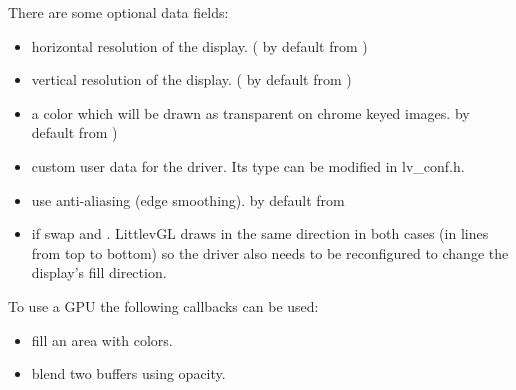\documentclass[letterpaper,10pt,english]{sphinxmanual}
\begin{document}
There are some optional data fields:
\begin{itemize}
\item {} 
 horizontal resolution of the display. ( by default from )

\item {} 
 vertical resolution of the display. ( by default from )

\item {} 
 a color which will be drawn as transparent on chrome keyed images.  by default from )

\item {} 
 custom user data for the driver. Its type can be modified in lv\_conf.h.

\item {} 
 use anti-aliasing (edge smoothing).  by default  from 

\item {} 
 if  swap  and . LittlevGL draws in the same direction in both cases (in lines from top to bottom) so the driver also needs to be reconfigured to change the display’s fill direction.

\end{itemize}

To use a GPU the following callbacks can be used:
\begin{itemize}
\item {} 
 fill an area with colors.

\item {} 
 blend two buffers using opacity.

\end{itemize}
\end{document}
